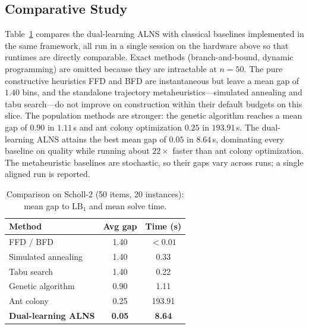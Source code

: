 \documentclass[conference]{IEEEtran}
\begin{document}
\subsection{Comparative Study}
Table~\ref{tab:compare} compares the dual-learning ALNS with classical baselines
implemented in the same framework, all run in a single session on the hardware
above so that runtimes are directly comparable. Exact methods (branch-and-bound,
dynamic programming) are omitted because they are intractable at $n=50$. The pure
constructive heuristics FFD and BFD are instantaneous but leave a mean gap of
$1.40$ bins, and the standalone trajectory metaheuristics---simulated annealing
and tabu search---do not improve on construction within their default budgets on
this slice. The population methods are stronger: the genetic algorithm reaches a
mean gap of $0.90$ in $1.11$\,s and ant colony optimization $0.25$ in
$193.91$\,s. The dual-learning ALNS attains the best mean gap of $0.05$ in
$8.64$\,s, dominating every baseline on quality while running about $22\times$
faster than ant colony optimization. The metaheuristic baselines are stochastic,
so their gaps vary across runs; a single aligned run is reported.

\begin{table}[htbp]
	\caption{Comparison on Scholl-2 (50 items, 20 instances): mean gap to $\mathrm{LB}_1$ and mean solve time.}
	\label{tab:compare}
	\centering
	\begin{tabular}{l c c}
		\hline
		\textbf{Method}             & \textbf{Avg gap} & \textbf{Time (s)} \\
		\hline
		FFD / BFD                   & 1.40             & $<0.01$           \\
		Simulated annealing         & 1.40             & 0.33              \\
		Tabu search                 & 1.40             & 0.22              \\
		Genetic algorithm           & 0.90             & 1.11              \\
		Ant colony                  & 0.25             & 193.91            \\
		\textbf{Dual-learning ALNS} & \textbf{0.05}    & \textbf{8.64}     \\
		\hline
	\end{tabular}
\end{table}
\end{document}
